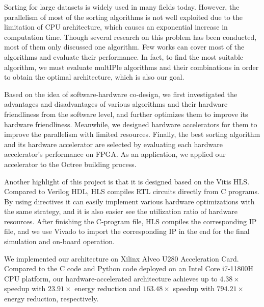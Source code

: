 \begin{abstract*}

Sorting for large datasets is widely used in many fields today. However, the parallelism of most of the sorting algorithms is not well exploited due to the limitation of CPU architecture, which causes an exponential increase in computation time. Though several research on this problem has been conducted, most of them only discussed one algorithm. Few works can cover most of the algorithms and evaluate their performance. In fact, to find the most suitable algorithm, we must evaluate multIPle algorithms and their combinations in order to obtain the optimal architecture, which is also our goal.


Based on the idea of software-hardware co-design, we first investigated the advantages and disadvantages of various algorithms and their hardware friendliness from the software level, and further optimizes them to improve its hardware friendliness. Meanwhile, we designed hardware accelerators for them to improve the parallelism with limited resources. Finally, the best sorting algorithm and its hardware accelerator are selected by evaluating each hardware accelerator's performance on FPGA. As an application, we applied our accelerator to the Octree building process.

Another highlight of this project is that it is designed based on the Vitis HLS. Compared to Verilog HDL, HLS compiles RTL circuits directly from C programs. By using directives it can easily implement various hardware optimizations with the same strategy, and it is also easier see the utilization ratio of hardware resources. After finishing the C-program file, HLS compiles the corresponding IP file, and we use Vivado to import the corresponding IP in the end for the final simulation and on-board operation.

We implemented our architecture on Xilinx Alveo U280 Acceleration Card. Compared to the C code and Python code deployed on an Intel Core i7-11800H CPU platform, our hardware-accelerated architecture achieves up to $4.38\times$ speedup with $23.91\times$ energy reduction and $163.48\times$ speedup with $794.21\times$ energy reduction, respectively.


\end{abstract*}
